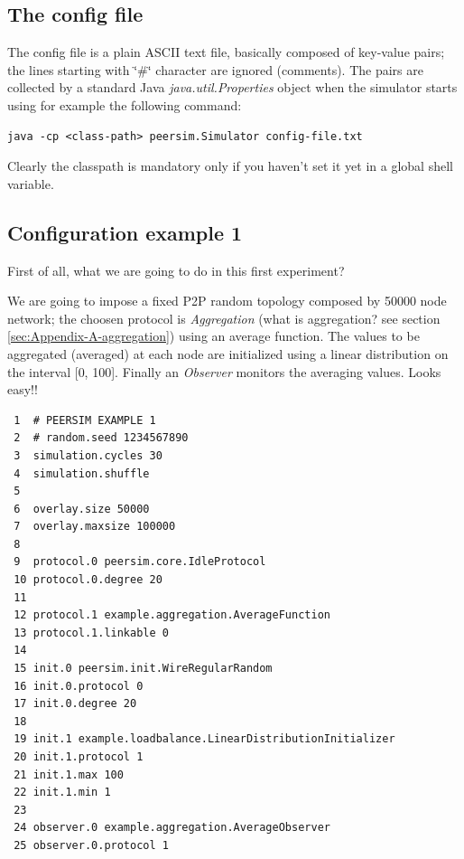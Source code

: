 \documentclass[a4paper,11pt]{article}
\begin{document}
\subsection{The config file}
\label{configfile}

The config file is a plain ASCII text file, basically composed of
key-value pairs; the lines starting with \char`\"{}\#\char`\"{} character
are ignored (comments). The pairs are collected by a standard Java
\emph{java.util.Properties} object when the simulator starts using
for example the following command:

\begin{verbatim}
java -cp <class-path> peersim.Simulator config-file.txt
\end{verbatim}

Clearly the classpath is mandatory only if you haven't set it yet
in a global shell variable. 

\subsection{Configuration example 1}

First of all, what we are going to do in this first experiment? 

We are going to impose a fixed P2P random topology composed by 50000
node network; the choosen protocol is \emph{Aggregation} (what is
aggregation? see section \ref{sec:Appendix-A-aggregation}) using
an average function. The values to be aggregated (averaged) at each
node are initialized using a linear distribution on the interval {[}0,
100{]}. Finally an \emph{Observer} monitors the averaging values.
Looks easy!!\\

\footnotesize
\begin{verbatim}
 1  # PEERSIM EXAMPLE 1
 2  # random.seed 1234567890
 3  simulation.cycles 30
 4  simulation.shuffle
 5 
 6  overlay.size 50000
 7  overlay.maxsize 100000
 8 
 9  protocol.0 peersim.core.IdleProtocol
 10 protocol.0.degree 20
 11
 12 protocol.1 example.aggregation.AverageFunction
 13 protocol.1.linkable 0
 14
 15 init.0 peersim.init.WireRegularRandom
 16 init.0.protocol 0
 17 init.0.degree 20
 18
 19 init.1 example.loadbalance.LinearDistributionInitializer
 20 init.1.protocol 1
 21 init.1.max 100
 22 init.1.min 1
 23
 24 observer.0 example.aggregation.AverageObserver
 25 observer.0.protocol 1
\end{verbatim}
\normalsize
\end{document}
